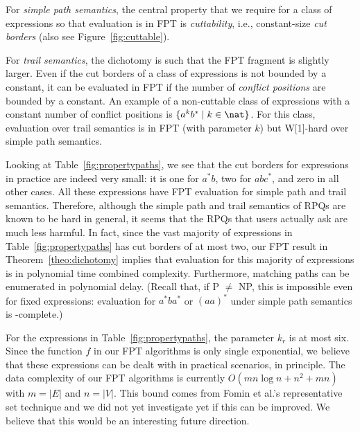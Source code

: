 \documentclass[a4paper,english]{lipics-v2016}
\theoremstyle{plain}
\begin{document}
For \emph{simple path semantics}, the central property that we require
for a class of expressions so that evaluation is in FPT is
\emph{cuttability}, i.e., constant-size \emph{cut borders} (also see
Figure~\ref{fig:cuttable}).  

For \emph{trail semantics}, the dichotomy is such that the FPT
fragment is slightly larger. Even if the cut borders of a class of
expressions is not bounded
by a constant, it can be evaluated in FPT if the number of
\emph{conflict positions} are bounded by a constant. An example of a
non-cuttable class of expressions with a constant number of conflict
positions is $\{a^kb^* \mid k \in \nat\}$. For this class, evaluation
over trail semantics is in FPT (with parameter $k$) but W[1]-hard over
simple path semantics.

Looking at Table~\ref{fig:propertypaths}, we see that the cut borders
for expressions in practice are indeed very small: it is one for $a^*
b$, two for $a b c^*$, and zero in all other cases. All these
expressions have FPT evaluation for simple path and trail semantics.
Therefore, although the simple path and trail semantics
of RPQs are known to be hard in general, it seems that the RPQs that
users actually ask are much less harmful. In fact, since the vast
majority of expressions in Table~\ref{fig:propertypaths} has cut
borders of at most two, our FPT result in Theorem~\ref{theo:dichotomy}
implies that evaluation for this majority of expressions is in
polynomial time combined complexity. Furthermore, matching paths can
be enumerated in polynomial delay. (Recall that, if P $\neq$ NP, this
is impossible even for fixed expressions: evaluation for $a^*ba^*$ or
$(aa)^*$ under simple path semantics is \np-complete.)

For the expressions in Table~\ref{fig:propertypaths}, the parameter
$k_r$ is at most six. Since the function $f$ in our FPT algorithms is only
single exponential, we believe that these expressions can be dealt
with in practical scenarios, in principle. The data complexity of our
FPT algorithms is currently $O(m n \log n + n^2 + mn)$ with $m = |E|$ and $n = |V|$. This 
bound comes from Fomin et al.'s representative set technique
\cite{fomin} and we did not yet investigate yet if this can be
improved. We believe that this would be an interesting future direction.
\end{document}
